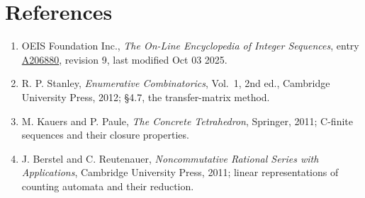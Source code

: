 \documentclass[11pt]{article}
\theoremstyle{definition}
\begin{document}
\section{References}

\begin{enumerate}

\item OEIS Foundation Inc., \emph{The On-Line Encyclopedia of Integer Sequences}, entry \href{https://oeis.org/A206880}{A206880}, revision 9, last modified Oct 03 2025.

\item R. P. Stanley, \emph{Enumerative Combinatorics}, Vol.~1, 2nd ed., Cambridge University Press, 2012; \S4.7, the transfer-matrix method.

\item M. Kauers and P. Paule, \emph{The Concrete Tetrahedron}, Springer, 2011; C-finite sequences and their closure properties.

\item J. Berstel and C. Reutenauer, \emph{Noncommutative Rational Series with Applications}, Cambridge University Press, 2011; linear representations of counting automata and their reduction.

\end{enumerate}
\end{document}
